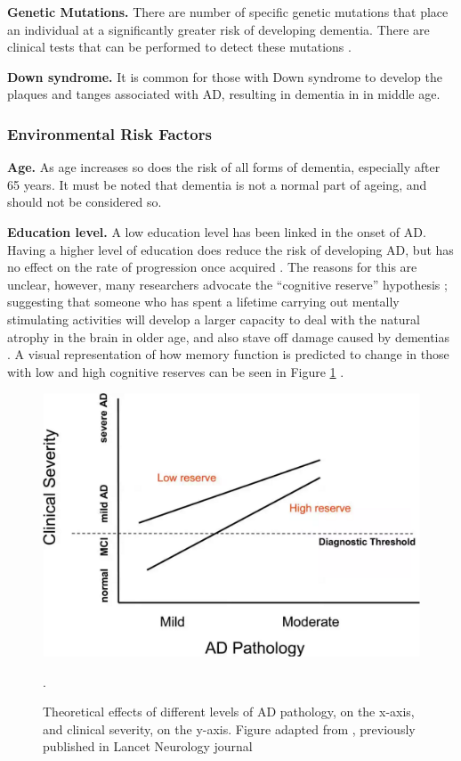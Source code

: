 \textbf{Genetic Mutations.}
There are number of specific genetic mutations that place an individual at a significantly greater risk of developing dementia. There are clinical tests that can be performed to detect these mutations \cite{MayoFoundationforMedicalEducationandResearch2015a}.

\textbf{Down syndrome.}
It is common for those with Down syndrome to develop the plaques and tanges associated with AD, resulting in dementia in in middle age.

\subsubsection{Environmental Risk Factors}

\textbf{Age.}
As age increases so does the risk of all forms of dementia, especially after 65 years. It must be noted that dementia is not a normal part of ageing, and should not be considered so.

\textbf{Education level.}
A low education level has been linked in the onset of AD. Having a higher level of education does reduce the risk of developing AD, but has no effect on the rate of progression once acquired \cite{Wilson2009}.
The reasons for this are unclear, however, many researchers advocate the ``cognitive reserve'' hypothesis \cite{Stern2012}; suggesting that someone who has spent a lifetime carrying out mentally stimulating activities will develop a larger capacity to deal with the natural atrophy in the brain in older age, and also stave off damage caused by dementias \cite{Norman2007, AlzheimerEurope2015}. A visual representation of how memory function is predicted to change in those with low and high cognitive reserves can be seen in Figure \ref{fig: lancet-neurology-adpathology} \cite{Stern2012}.

\begin{figure}[h]
    \centering
    \includegraphics[scale=0.1, angle=0]{Files/literature-review/figures/lancet-neurology-adpathology}
    \caption{Theoretical effects of different levels of AD pathology, on the x-axis, and clinical severity, on the y-axis. Figure adapted from \citeauthor{Stern2012} \citeyear{Stern2012}, previously published in Lancet Neurology journal \cite{Stern2012}}.
    \label{fig: lancet-neurology-adpathology}
\end{figure}


